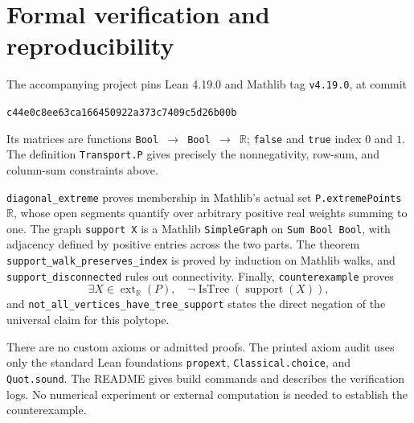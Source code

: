 \documentclass[11pt]{article}
\newcommand{\R}{\mathbb R}
\begin{document}
\section{Formal verification and reproducibility}
The accompanying project pins Lean 4.19.0 and Mathlib tag \texttt{v4.19.0}, at commit \begin{center}\small\texttt{c44e0c8ee63ca166450922a373c7409c5d26b00b}\end{center}
Its matrices are functions \texttt{Bool $\to$ Bool $\to$ $\R$}; \texttt{false} and \texttt{true} index $0$ and $1$. The definition \texttt{Transport.P} gives precisely the nonnegativity, row-sum, and column-sum constraints above.

\texttt{diagonal\_extreme} proves membership in Mathlib's actual set
\texttt{P.extremePoints $\R$}, whose open segments quantify over arbitrary positive real weights summing to one. The graph \texttt{support X} is a Mathlib \texttt{SimpleGraph} on \texttt{Sum Bool Bool}, with adjacency defined by positive entries across the two parts. The theorem \texttt{support\_walk\_preserves\_index} is proved by induction on Mathlib walks, and \texttt{support\_disconnected} rules out connectivity. Finally,
\texttt{counterexample} proves
\[
 \exists X\in\operatorname{ext}_{\R}(P),\quad
 \neg\operatorname{IsTree}(\operatorname{support}(X)),
\]
and \texttt{not\_all\_vertices\_have\_tree\_support} states the direct negation of the universal claim for this polytope.

There are no custom axioms or admitted proofs. The printed axiom audit uses only the standard Lean foundations \texttt{propext}, \texttt{Classical.choice}, and \texttt{Quot.sound}. The README gives build commands and describes the verification logs. No numerical experiment or external computation is needed to establish the counterexample.
\end{document}
